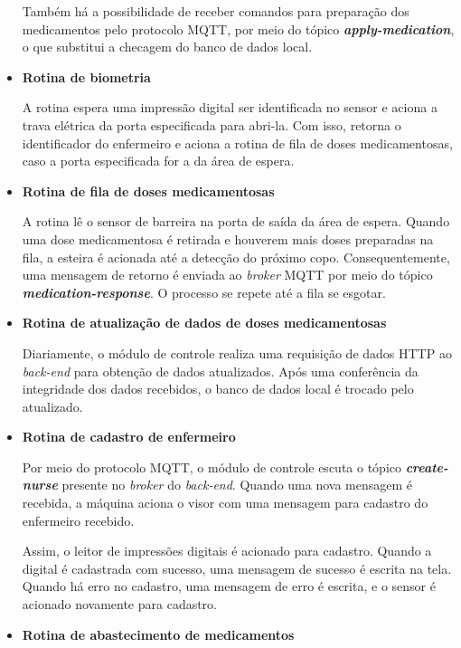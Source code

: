 \begin{itemize}
    Também há a possibilidade de receber comandos para preparação dos medicamentos pelo protocolo MQTT, por meio do tópico \textit{\textbf{apply-medication}}, o que substitui a checagem do banco de dados local.
    
    \item \textbf{Rotina de biometria}
    
    A rotina espera uma impressão digital ser identificada no sensor e aciona a trava elétrica da porta especificada para abri-la. Com isso, retorna o identificador do enfermeiro e aciona a rotina de fila de doses medicamentosas, caso a porta especificada for a da área de espera.
    
    \item \textbf{Rotina de fila de doses medicamentosas}
    
    A rotina lê o sensor de barreira na porta de saída da área de espera. Quando uma dose medicamentosa é retirada e houverem mais doses preparadas na fila, a esteira é acionada 
    até a detecção do próximo copo. Consequentemente, uma mensagem de retorno é enviada ao \textit{broker} MQTT por meio do tópico \textit{\textbf{medication-response}}. O processo se repete até a fila se esgotar.
    
    \item \textbf{Rotina de atualização de dados de doses medicamentosas} 
    
    Diariamente, o módulo de controle realiza uma requisição de dados HTTP ao \textit{back-end} para obtenção de dados atualizados. Após uma conferência da integridade dos dados recebidos, o banco de dados local é trocado pelo atualizado.
    
    \item \textbf{Rotina de cadastro de enfermeiro}
    
    Por meio do protocolo MQTT, o módulo de controle escuta o tópico \textbf{\textit{create-nurse}} presente no \textit{broker} do \textit{back-end}. Quando uma nova mensagem é recebida, a máquina aciona o visor com uma mensagem para cadastro do enfermeiro recebido.
    
    Assim, o leitor de impressões digitais é acionado para cadastro. Quando a digital é cadastrada com sucesso, uma mensagem de sucesso é escrita na tela. Quando há erro no cadastro, uma mensagem de erro é escrita, e o sensor é acionado novamente para cadastro.
    
    \item \textbf{Rotina de abastecimento de medicamentos}
    

\end{itemize}

